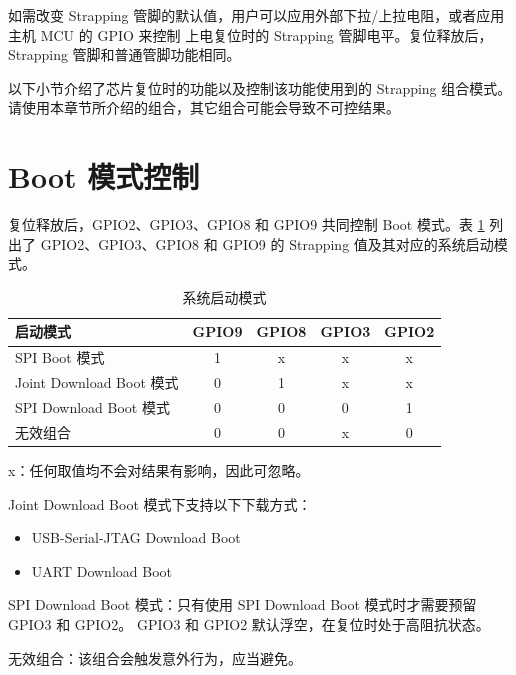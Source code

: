 \documentclass[main\_\_CN.tex]{subfiles}
\begin{document}
如需改变 Strapping 管脚的默认值，用户可以应用外部下拉/上拉电阻，或者应用主机 MCU 的 GPIO 来控制 \chipname{} 上电复位时的 Strapping 管脚电平。复位释放后，Strapping 管脚和普通管脚功能相同。

\begin{tiplisting}
以下小节介绍了芯片复位时的功能以及控制该功能使用到的 Strapping 组合模式。请使用本章节所介绍的组合，其它组合可能会导致不可控结果。
\end{tiplisting}

\section{Boot 模式控制}\label{sec:boot-mode-control}

复位释放后，GPIO2、GPIO3、GPIO8 和 GPIO9 共同控制 Boot 模式。表 \ref{tab:bootctrl-boot-mode-control} 列出了 GPIO2、GPIO3、GPIO8 和 GPIO9 的 Strapping 值及其对应的系统启动模式。

\begin{table}[H]
    \centering
\caption{系统启动模式}
\label{tab:bootctrl-boot-mode-control}
\begin{threeparttable}
    \begin{tabular}{ | p{5cm} | c | c | c |c| }
    \hline
    \rowcolor{lightgray}
  \textbf{启动模式} & \textbf{GPIO9} & \textbf{GPIO8} & \textbf{GPIO3} & \textbf{GPIO2}\\ \hline
  SPI Boot 模式 & 1 & x\tnote{1} & x & x \\ \hline
  Joint Download Boot 模式\tnote{2} & 0 & 1 & x & x\\ \hline
  SPI Download Boot 模式\tnote{3} & 0 & 0 & 0 & 1 \\ \hline
  无效组合\tnote{4} & 0 & 0  & x & 0 \\ \hline
\end{tabular}

\begin{tablenotes}
            \item[1] x：任何取值均不会对结果有影响，因此可忽略。
            \item[2] Joint Download Boot 模式下支持以下下载方式：
                \begin{itemize}
                    \item USB-Serial-JTAG Download Boot
                    \item UART Download Boot
                \end{itemize}
            \item[3] SPI Download Boot 模式：只有使用 SPI Download Boot 模式时才需要预留 GPIO3 和 GPIO2。 GPIO3 和 GPIO2 默认浮空，在复位时处于高阻抗状态。
            \item[4] 无效组合：该组合会触发意外行为，应当避免。
        \end{tablenotes}
     \end{threeparttable}
\end{table}
\end{document}
